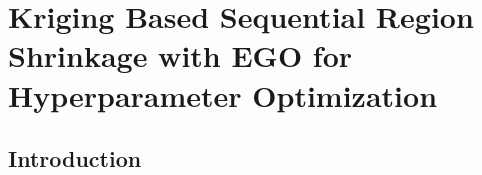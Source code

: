 \documentclass [PhD] {package/uclathes}
\begin{document}
\chapter{Kriging Based Sequential Region Shrinkage with EGO for  Hyperparameter Optimization }
%
%
%
%
%
%
%
%
%
%
%
%
\section{Introduction}
\end{document}
